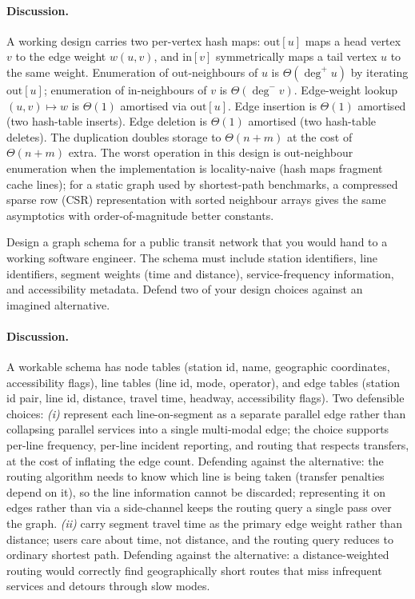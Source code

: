 \paragraph{Discussion.}
A working design carries two per-vertex hash maps: $\mathrm{out}[u]$
maps a head vertex $v$ to the edge weight $w(u, v)$, and
$\mathrm{in}[v]$ symmetrically maps a tail vertex $u$ to the same
weight. Enumeration of out-neighbours of $u$ is $\Theta(\deg^{+}
u)$ by iterating $\mathrm{out}[u]$; enumeration of in-neighbours
of $v$ is $\Theta(\deg^{-} v)$. Edge-weight lookup
$(u, v) \mapsto w$ is $\Theta(1)$ amortised via $\mathrm{out}[u]$.
Edge insertion is $\Theta(1)$ amortised (two hash-table inserts).
Edge deletion is $\Theta(1)$ amortised (two hash-table deletes).
The duplication doubles storage to $\Theta(n + m)$ at the cost of
$\Theta(n + m)$ extra. The worst operation in this design is
out-neighbour enumeration when the implementation is locality-naive
(hash maps fragment cache lines); for a static graph used by
shortest-path benchmarks, a compressed sparse row (CSR)
representation with sorted neighbour arrays gives the same
asymptotics with order-of-magnitude better constants.

\begin{exercise}
Design a graph schema for a public transit network that you would
hand to a working software engineer. The schema must include
station identifiers, line identifiers, segment weights (time and
distance), service-frequency information, and accessibility
metadata. Defend two of your design choices against an imagined
alternative.
\end{exercise}

\paragraph{Discussion.}
A workable schema has node tables (station id, name, geographic
coordinates, accessibility flags), line tables (line id, mode,
operator), and edge tables (station id pair, line id, distance,
travel time, headway, accessibility flags). Two defensible choices:
\textit{(i)} represent each line-on-segment as a separate parallel
edge rather than collapsing parallel services into a single
multi-modal edge; the choice supports per-line frequency, per-line
incident reporting, and routing that respects transfers, at the
cost of inflating the edge count. Defending against the
alternative: the routing algorithm needs to know which line is
being taken (transfer penalties depend on it), so the line
information cannot be discarded; representing it on edges rather
than via a side-channel keeps the routing query a single pass over
the graph. \textit{(ii)} carry segment travel time as the primary
edge weight rather than distance; users care about time, not
distance, and the routing query reduces to ordinary shortest path.
Defending against the alternative: a distance-weighted routing
would correctly find geographically short routes that miss
infrequent services and detours through slow modes.

